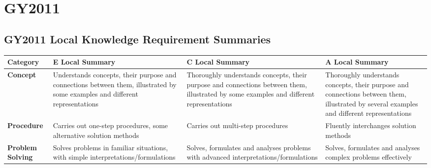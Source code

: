 %
%
\chapter{GY2011}
\newpage
\pagestyle{empty}
\begin{landscape}
\section{GY2011 Local Knowledge Requirement Summaries}
\label{chap:LocalKnowledgeRequirements}


\begin{longtable}{ | A | B | C | D |}
\hline 
{}   \textbf{Category} &
    \textbf{E Local Summary} &
    \textbf{C Local Summary} &
    \textbf{A Local Summary}\\
  \hline  
\endhead  


\textbf{Concept} &
\alert{Understands} concepts, their purpose and connections between them, illustrated by \alert{some} examples and different representations &
\alert{Thoroughly understands} concepts, their purpose and connections between them, illustrated by \alert{some} examples and different representations &
\alert{Thoroughly understands} concepts, their purpose and connections between them, illustrated by \alert{several} examples and different representations
\\

\hline

\textbf{Procedure} &
Carries out one-step procedures, \alert{some} alternative solution methods &
Carries out \alert{multi-step} procedures&
\alert{Fluently interchanges} solution methods
\\

\hline

\textbf{Problem Solving} &
Solves problems in \alert{familiar} situations, with \alert{simple} interpretations/formulations &
Solves, formulates and analyses problems with \alert{advanced} interpretations/formulations&
Solves, formulates and analyses \alert{complex problems effectively}
\\

\hline


\end{longtable}
\end{landscape}
